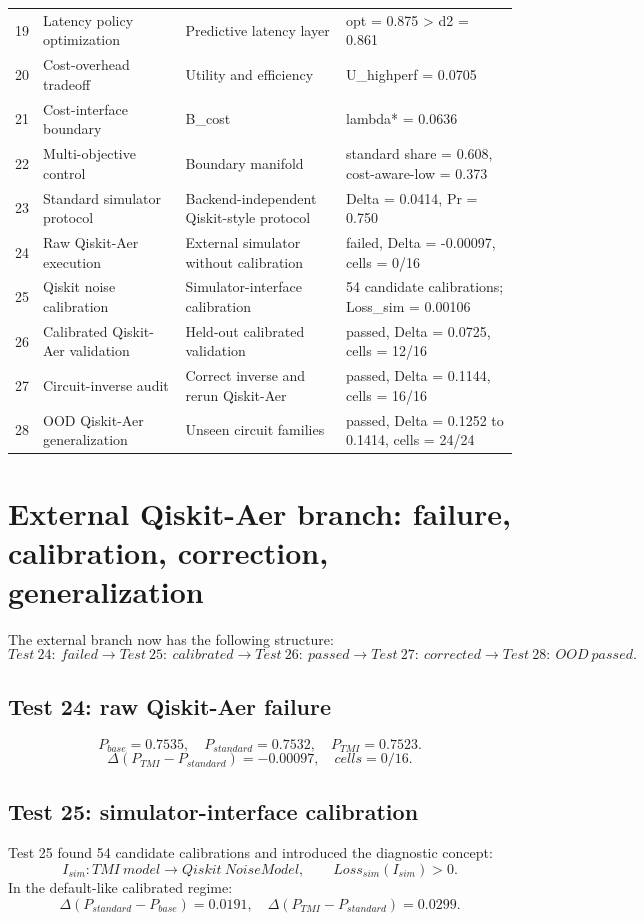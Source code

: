 \documentclass[12pt,a4paper]{article}
\begin{document}
\begin{longtable}{p{0.9cm}p{4.0cm}p{5.0cm}p{5.4cm}}
19 & Latency policy optimization & Predictive latency layer & opt = 0.875 > d2 = 0.861 \\
20 & Cost-overhead tradeoff & Utility and efficiency & U\_highperf = 0.0705 \\
21 & Cost-interface boundary & B\_cost & lambda* = 0.0636 \\
22 & Multi-objective control & Boundary manifold & standard share = 0.608, cost-aware-low = 0.373 \\
23 & Standard simulator protocol & Backend-independent Qiskit-style protocol & Delta = 0.0414, Pr = 0.750 \\
24 & Raw Qiskit-Aer execution & External simulator without calibration & failed, Delta = -0.00097, cells = 0/16 \\
25 & Qiskit noise calibration & Simulator-interface calibration & 54 candidate calibrations; Loss\_sim = 0.00106 \\
26 & Calibrated Qiskit-Aer validation & Held-out calibrated validation & passed, Delta = 0.0725, cells = 12/16 \\
27 & Circuit-inverse audit & Correct inverse and rerun Qiskit-Aer & passed, Delta = 0.1144, cells = 16/16 \\
28 & OOD Qiskit-Aer generalization & Unseen circuit families & passed, Delta = 0.1252 to 0.1414, cells = 24/24 \\
\bottomrule
\end{longtable}

\section{External Qiskit-Aer branch: failure, calibration, correction, generalization}

The external branch now has the following structure:
\[
Test\ 24:\ failed\to Test\ 25:\ calibrated\to Test\ 26:\ passed\to Test\ 27:\ corrected\to Test\ 28:\ OOD\ passed.
\]

\subsection{Test 24: raw Qiskit-Aer failure}
\[
P_{base}=0.7535,\quad P_{standard}=0.7532,\quad P_{TMI}=0.7523.
\]
\[
\Delta(P_{TMI}-P_{standard})=-0.00097,\quad cells=0/16.
\]

\subsection{Test 25: simulator-interface calibration}
Test 25 found 54 candidate calibrations and introduced the diagnostic concept:
\[
I_{sim}:TMI\ model\to Qiskit\ NoiseModel,\qquad Loss_{sim}(I_{sim})>0.
\]
In the default-like calibrated regime:
\[
\Delta(P_{standard}-P_{base})=0.0191,\quad
\Delta(P_{TMI}-P_{standard})=0.0299.
\]
\end{document}
